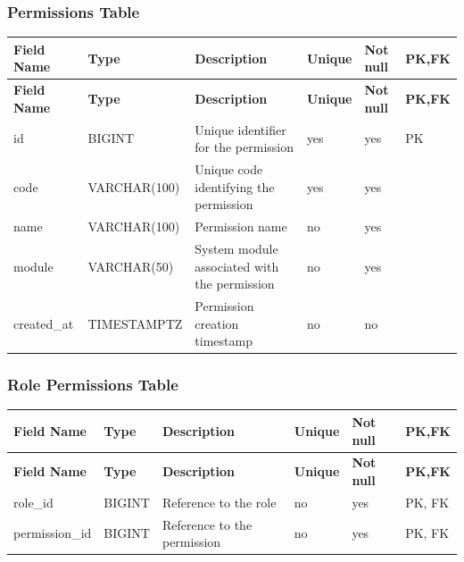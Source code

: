 \vspace{1em}
\subsubsection{Permissions Table}
\label{subsubsec:permissions-table}

\vspace{0.5em}
\renewcommand{\arraystretch}{1.15}
\setlength{\tabcolsep}{4pt}
\small
\begin{longtable}{|>{\raggedright\arraybackslash}p{}|>{\raggedright\arraybackslash}p{}|>{\raggedright\arraybackslash}p{}|>{\centering\arraybackslash}p{}|>{\centering\arraybackslash}p{}|>{\centering\arraybackslash}p{}|}
\hline
\textbf{Field Name} & \textbf{Type} & \textbf{Description} & \textbf{Unique} & \textbf{Not null} & \textbf{PK,FK} \\
\hline
\endfirsthead
\textbf{Field Name} & \textbf{Type} & \textbf{Description} & \textbf{Unique} & \textbf{Not null} & \textbf{PK,FK} \\
\hline
\endhead
id & BIGINT & Unique identifier for the permission & yes & yes & PK \\
\hline
code & VARCHAR(100) & Unique code identifying the permission & yes & yes & \\
\hline
name & VARCHAR(100) & Permission name & no & yes & \\
\hline
module & VARCHAR(50) & System module associated with the permission & no & yes & \\
\hline
created\_at & TIMESTAMPTZ & Permission creation timestamp & no & no & \\
\hline
\end{longtable}

\vspace{1em}
\subsubsection{Role Permissions Table}
\label{subsubsec:role-permissions-table}

\vspace{0.5em}
\renewcommand{\arraystretch}{1.15}
\setlength{\tabcolsep}{4pt}
\small
\begin{longtable}{|>{\raggedright\arraybackslash}p{}|>{\raggedright\arraybackslash}p{}|>{\raggedright\arraybackslash}p{}|>{\centering\arraybackslash}p{}|>{\centering\arraybackslash}p{}|>{\centering\arraybackslash}p{}|}
\hline
\textbf{Field Name} & \textbf{Type} & \textbf{Description} & \textbf{Unique} & \textbf{Not null} & \textbf{PK,FK} \\
\hline
\endfirsthead
\textbf{Field Name} & \textbf{Type} & \textbf{Description} & \textbf{Unique} & \textbf{Not null} & \textbf{PK,FK} \\
\hline
\endhead
role\_id & BIGINT & Reference to the role & no & yes & PK, FK \\
\hline
permission\_id & BIGINT & Reference to the permission & no & yes & PK, FK \\
\hline
\end{longtable}

